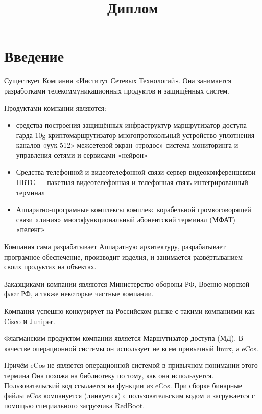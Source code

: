 \documentclass[12pt]{article}
\title{Диплом}
\begin{document}
\maketitle
\pagebreak
\section{Введение}

Существует Компания «Институт Сетевых Технологий».
Она занимается разработками телекоммуникационных продуктов и защищённых систем.

Продуктами компании являются:
\begin{itemize}
    \item средства построения защищённых инфраструктур
    \subitem маршрутизатор доступа гарда 10g
    \subitem криптомаршрутизатор многопротокольный
    \subitem устройство уплотнения каналов «уук-512»
    \subitem межсетевой экран «тродос»
    \subitem система мониторинга и управления сетями и сервисами «нейрон»
    \item Средства телефонной и видеотелефонной связи
    \subitem сервер видеоконференцсвязи
    \subitem ПВТС — пакетная видеотелефонная и телефонная связь
    \subitem интегрированный терминал
    \item Аппаратно-програмные комплексы
    \subitem комплекс корабельной громкоговорящей связи «линия»
    \subitem многофункциональный абонентский терминал (МФАТ) «пеленг»
\end{itemize}

Компания сама разрабатывает Аппаратную архитектуру, разрабатывает програмное обеспечение, производит изделия, и занимается развёртыванием своих продуктах на объектах.

Заказщиками компании являются Министерство обороны РФ, Военно морской флот РФ, а также некоторые частные компании.

Компания успешно конкурирует на Российском рынке с такими компаниями как Cisco и Juniper.

Флагманским продуктом компании является Маршутизатор доступа (МД). В качестве операционной системы он использует не всем привычный linux, а eCos.

Причём eCos не является операционной системой в привычном понимании этого термина
Она похожа на библиотеку по тому, как она используется.
Пользовательский код ссылается на функции из eCos.
При сборке бинарные файлы eCos компануется (линкуется) с пользовательским кодом и загружается с помощью специального загрузчика RedBoot.
\end{document}
